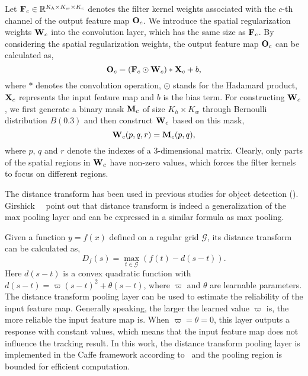\documentclass[10pt,twocolumn,letterpaper]{article}
\begin{document}
Let ${\bf F}_c\in \mathbb{R}^{K_h\times K_w\times K_c}$ denotes the filter kernel weights
associated with the $c$-th channel of the output feature map ${\bf O}_c$. We introduce the
spatial regularization weights ${\bf W}_c$ into the convolution layer, which has the same
size as ${\bf F}_c$. By considering the spatial regularization weights, the output feature
map ${\bf O}_c$ can be calculated as,
\begin{equation}
  {\bf O}_c=({\bf F}_c\odot{\bf W}_c)*{\bf X}_c+b,
\end{equation}
where $*$ denotes the convolution operation, $\odot$ stands for the Hadamard product,
${\bf X}_c$ represents the input feature map and $b$ is the bias term.
For constructing ${\bf W}_c$, we first generate a binary mask ${\bf M}_c$ of size
$K_h\times K_w$ through Bernoulli distribution $B(0.3)$ and then construct ${\bf W}_c$
based on this mask,
\begin{equation}
 {{\bf{W}}_c}(p,q,r) = {{\bf{M}}_c}(p,q),
\end{equation}
where $p$, $q$ and $r$ denote the indexes of a 3-dimensional matrix. Clearly, only parts
of the spatial regions in ${\bf{W}}_c$ have non-zero values, which forces the filter kernels
to focus on different regions.

\vspace{1mm}
 The distance transform has been used
in previous studies for object detection (\cite{felzenszwalb2010object,savalle2014deformable}).
Girshick~\etal~\cite{girshick2015deformable} point out that distance transform is indeed a
generalization of the max pooling layer and can be expressed in a similar formula as max pooling.

Given a function $y=f(x)$ defined on a regular grid $\mathcal{G}$, its distance transform can be
calculated as,
\begin{equation}
{D_f}(s) = \max_{{t \in \mathcal{G}}}(f(t) - d(s - t)).
\end{equation}
Here $d(s - t)$ is a convex quadratic function with $d(s - t)=\varpi (s-t)^2+\theta(s-t)$,
where $\varpi$ and $\theta$ are learnable parameters. The distance transform pooling layer
can be used to estimate the reliability of the input feature map. Generally speaking,
the larger the learned value $\varpi$ is, the more reliable the input feature map is.
When $\varpi=\theta=0$, this layer outputs a response with constant values, which means
that the input feature map does not influence the tracking result. In this work, the distance
transform pooling layer is implemented in the Caffe framework according
to~\cite{goodfellow2013maxout} and the pooling region is bounded for efficient computation.
\end{document}
